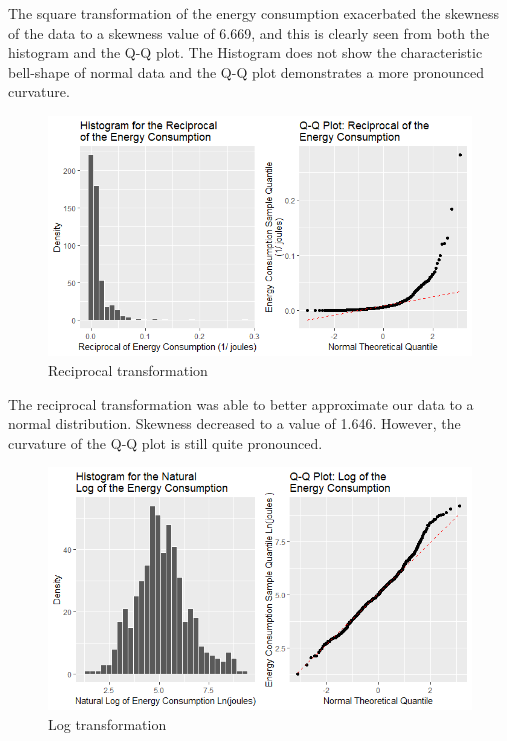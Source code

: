 The square transformation of the energy consumption exacerbated the skewness of the data to a skewness value of 6.669, and this is clearly seen from both the histogram and the Q-Q plot.  The Histogram does not show the characteristic bell-shape of normal data and the Q-Q plot demonstrates a more pronounced curvature.


\begin{figure}[H]
  \includegraphics[width=\linewidth]{./NewImages/Fig_9_Reciprocal_Transform.png}
  \caption{Reciprocal transformation}
  \label{fig:histqq-rec}
\end{figure}

The reciprocal transformation was able to better approximate our data to a normal distribution. Skewness decreased to a value of 1.646. However, the curvature of the Q-Q plot is still quite pronounced.

\begin{figure}[H]
  \includegraphics[width=\linewidth]{./NewImages/Fig_10_Log_Transform.png}
  \caption{Log transformation}
  \label{fig:histqq-log}
\end{figure}

